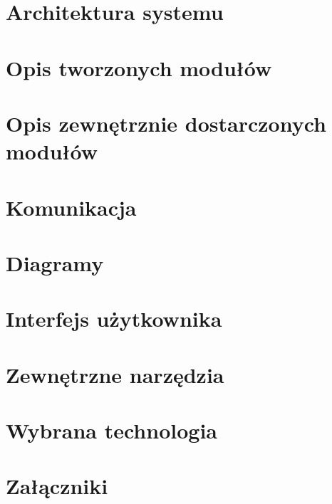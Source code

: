 \documentclass[12pt]{article}
\begin{document}

\pagebreak

\section{Architektura systemu} %


\pagebreak

\section{Opis tworzonych modułów} %


\pagebreak

\section{Opis zewnętrznie dostarczonych modułów} %


\pagebreak

\section{Komunikacja} %


\pagebreak

\section{Diagramy} %


\pagebreak

\section{Interfejs użytkownika} %


\pagebreak

\section{Zewnętrzne narzędzia} %


\pagebreak

\section{Wybrana technologia} %


\pagebreak

\section{Załączniki}


\end{document}
